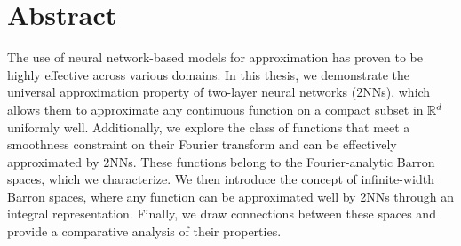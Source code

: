 \chapter*{Abstract}

The use of neural network-based models for approximation has proven to be highly
effective across various domains. In this thesis, we demonstrate the universal
approximation property of two-layer neural networks (2NNs), which allows them to
approximate any continuous function on a compact subset in $\mathbb{R}^d$ uniformly
well. Additionally, we explore the class of functions that meet a smoothness
constraint on their Fourier transform and can be effectively approximated by
2NNs. These functions belong to the Fourier-analytic Barron spaces, which we
characterize. We then introduce the concept of infinite-width Barron spaces,
where any function can be approximated well by 2NNs through an integral
representation. Finally, we draw connections between these spaces and provide a
comparative analysis of their properties.

